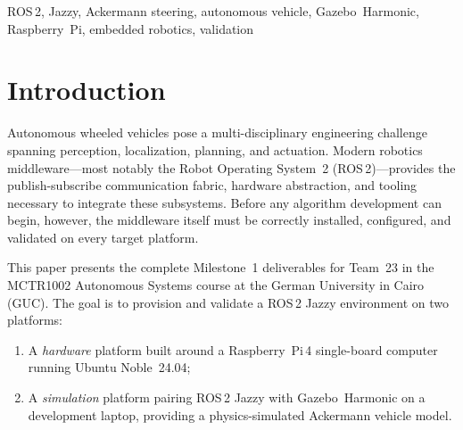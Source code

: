 \documentclass[conference]{IEEEtran}
\begin{document}
\begin{abstract}
Autonomous ground vehicles built on Ackermann steering geometry require a robust
software middleware layer before any perception, localization, or planning algorithms
can be developed. This paper documents the Milestone~1 validation of a ROS\,2 Jazzy
environment for an autonomous Ackermann vehicle project, targeting two distinct
execution contexts: an embedded Raspberry~Pi\,4 hardware platform and a desktop
Gazebo~Harmonic simulation platform. We describe the environment provisioning
procedure, the custom ROS\,2 Python packages developed for validation, and the
observable evidence---terminal logs and \texttt{ros2 doctor} diagnostics---confirming
correct operation. A publisher--subscriber node interacting with a simulated Ackermann
vehicle via \texttt{/cmd\_vel} and \texttt{/odom} topics is also presented. All five
\texttt{ros2 doctor} health checks passed on the hardware platform, and both
environments produced expected log output, confirming readiness for subsequent
milestones covering localization, navigation, and control.
\end{abstract}

\begin{IEEEkeywords}
ROS\,2, Jazzy, Ackermann steering, autonomous vehicle, Gazebo~Harmonic,
Raspberry~Pi, embedded robotics, validation
\end{IEEEkeywords}

\section{Introduction}
\label{sec:intro}

Autonomous wheeled vehicles pose a multi-disciplinary engineering challenge spanning
perception, localization, planning, and actuation. Modern robotics middleware---most
notably the Robot Operating System~2 (ROS\,2)---provides the publish-subscribe
communication fabric, hardware abstraction, and tooling necessary to integrate these
subsystems. Before any algorithm development can begin, however, the middleware
itself must be correctly installed, configured, and validated on every target platform.

This paper presents the complete Milestone~1 deliverables for Team~23 in the
MCTR1002 Autonomous Systems course at the German University in Cairo (GUC). The
goal is to provision and validate a ROS\,2 Jazzy environment on two platforms:
\begin{enumerate}
  \item A \emph{hardware} platform built around a Raspberry~Pi\,4 single-board
        computer running Ubuntu Noble~24.04;
  \item A \emph{simulation} platform pairing ROS\,2 Jazzy with Gazebo~Harmonic on
        a development laptop, providing a physics-simulated Ackermann vehicle model.
\end{enumerate}
\end{document}
